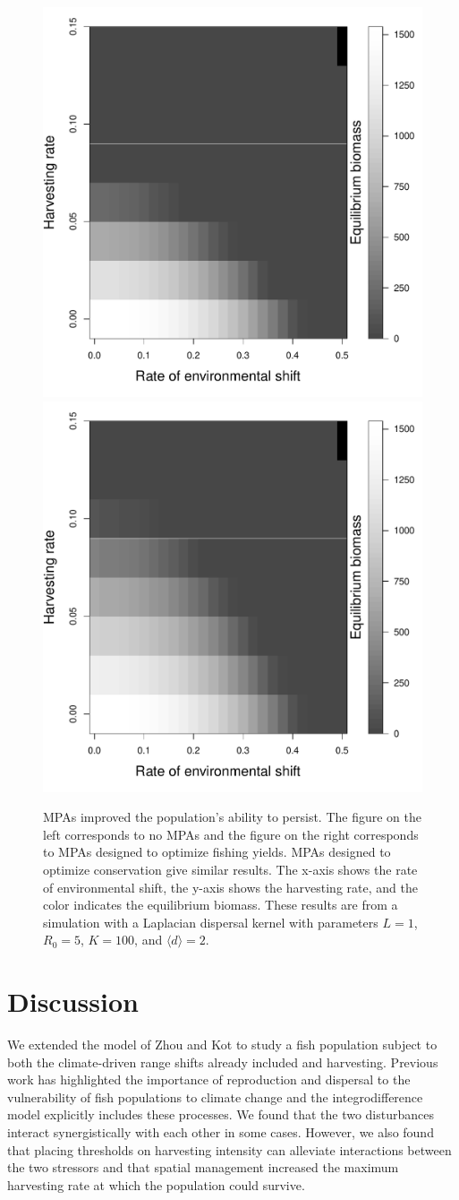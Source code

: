 \documentclass[]{article}
\begin{document}
\begin{figure}[htbp]
\begin{center}
\includegraphics[width=.45\textwidth]{plots/eqbiomass_sim.pdf}
\includegraphics[width=.45\textwidth]{plots/eqbiomass_mpa.pdf}
\caption{MPAs improved the population's ability to persist.  The figure on the left corresponds to no MPAs and the figure on the right corresponds to MPAs designed to optimize fishing yields.  MPAs designed to optimize conservation give similar results.  The x-axis shows the rate of environmental shift, the y-axis shows the harvesting rate, and the color indicates the equilibrium biomass.  These results are from a simulation with a Laplacian dispersal kernel with parameters $L=1$, $R_0=5$, $K=100$, and $\langle d \rangle =2$.}
\label{MPAs}
\end{center}
\end{figure}

\section{Discussion}

We extended the model of Zhou and Kot \citep{ZhouKot2011} to study a fish population subject to both the climate-driven range shifts already included and harvesting. Previous work has highlighted the importance of 
reproduction and dispersal to the vulnerability of fish populations to climate change \citep[\citet{Fordhametal2013}]
{Hastingsetal2005} and the integrodifference model explicitly includes these processes. We found that 
the two disturbances interact synergistically with each other in some cases. However, we also found that 
placing thresholds on harvesting intensity can alleviate interactions between the two stressors and that spatial 
management increased the maximum harvesting rate at which the population could survive.
\end{document}
